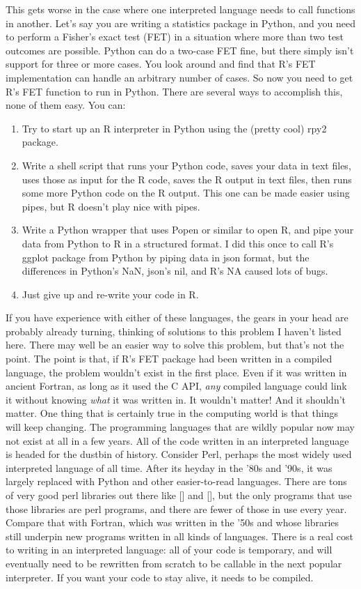 \documentclass[12pt]{article}
\begin{document}
This gets worse in the case where one interpreted language needs to call
functions in another. Let's say you are writing a statistics package in Python,
and you need to perform a Fisher's exact test (FET) in a situation where more
than two test outcomes are possible. Python can do a two-case FET fine, but
there simply isn't support for three or more cases. You look around and find
that R's FET implementation can handle an arbitrary number of cases. So now you
need to get R's FET function to run in Python. There are several ways to
accomplish this, none of them easy. You can:

\begin{enumerate}
    \item Try to start up an R interpreter in Python using the (pretty cool) rpy2 package.
    \item Write a shell script that runs your Python code, saves your data in text files, uses those as input for the R code, saves the R output in text files, then runs some more Python code on the R output. This one can be made easier using pipes, but R doesn't play nice with pipes.
    \item Write a Python wrapper that uses Popen or similar to open R, and pipe your data from Python to R in a structured format. I did this once to call R's ggplot package from Python by piping data in json format, but the differences in Python's NaN, json's nil, and R's NA caused lots of bugs.
    \item Just give up and re-write your code in R.
\end{enumerate}

If you have experience with either of these languages, the gears in your head
are probably already turning, thinking of solutions to this problem I haven't
listed here. There may well be an easier way to solve this problem, but that's
not the point.  The point is that, if R's FET package had been written in a
compiled language, the problem wouldn't exist in the first place. Even if it
was written in ancient Fortran, as long as it used the C API, \textit{any}
compiled language could link it without knowing \textit{what} it was written
in. It wouldn't matter! And it shouldn't matter. One thing that is certainly
true in the computing world is that things will keep changing. The programming
languages that are wildly popular now may not exist at all in a few years. All
of the code written in an interpreted language is headed for the dustbin of
history. Consider Perl, perhaps the most widely used interpreted language of
all time.  After its heyday in the '80s and '90s, it was largely replaced with
Python and other easier-to-read languages. There are tons of very good perl
libraries out there like [] and [], but the only programs that use those
libraries are perl programs, and there are fewer of those in use every year.
Compare that with Fortran, which was written in the '50s and whose libraries
still underpin new programs written in all kinds of languages. There is a real
cost to writing in an interpreted language: all of your code is temporary,
and will eventually need to be rewritten from scratch to be callable in the next
popular interpreter. If you want your code to stay alive, it needs to be compiled.
\end{document}

